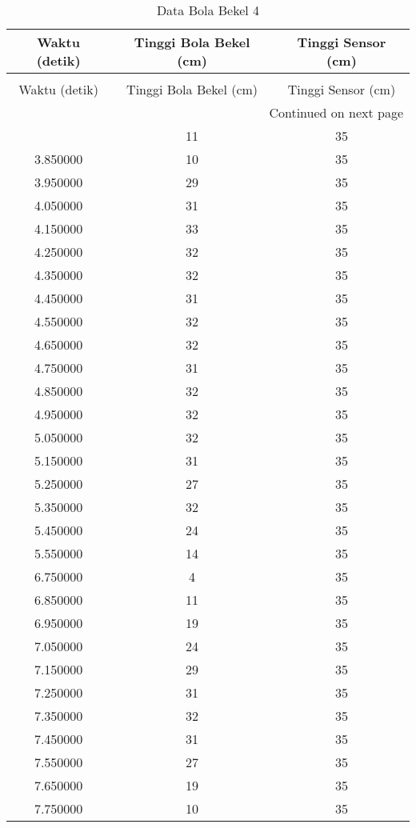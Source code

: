 \begin{longtable}[htbp]{|c|c|c|}
\caption{Data Bola Bekel 4} \\
\hline
Waktu (detik) & Tinggi Bola Bekel (cm) & Tinggi Sensor (cm) \\ \hline
\endfirsthead
\caption[]{Data Bola Bekel 4} \\
\hline
Waktu (detik) & Tinggi Bola Bekel (cm) & Tinggi Sensor (cm) \\ \hline
\endhead
\multicolumn{3}{r}{Continued on next page} \\
\endfoot
\endlastfoot
3.750000 & 11 & 35 \\ \hline
3.850000 & 10 & 35 \\ \hline
3.950000 & 29 & 35 \\ \hline
4.050000 & 31 & 35 \\ \hline
4.150000 & 33 & 35 \\ \hline
4.250000 & 32 & 35 \\ \hline
4.350000 & 32 & 35 \\ \hline
4.450000 & 31 & 35 \\ \hline
4.550000 & 32 & 35 \\ \hline
4.650000 & 32 & 35 \\ \hline
4.750000 & 31 & 35 \\ \hline
4.850000 & 32 & 35 \\ \hline
4.950000 & 32 & 35 \\ \hline
5.050000 & 32 & 35 \\ \hline
5.150000 & 31 & 35 \\ \hline
5.250000 & 27 & 35 \\ \hline
5.350000 & 32 & 35 \\ \hline
5.450000 & 24 & 35 \\ \hline
5.550000 & 14 & 35 \\ \hline
6.750000 & 4 & 35 \\ \hline
6.850000 & 11 & 35 \\ \hline
6.950000 & 19 & 35 \\ \hline
7.050000 & 24 & 35 \\ \hline
7.150000 & 29 & 35 \\ \hline
7.250000 & 31 & 35 \\ \hline
7.350000 & 32 & 35 \\ \hline
7.450000 & 31 & 35 \\ \hline
7.550000 & 27 & 35 \\ \hline
7.650000 & 19 & 35 \\ \hline
7.750000 & 10 & 35 \\ \hline

\end{longtable}
